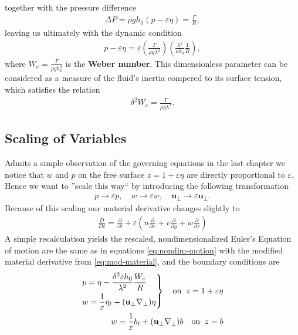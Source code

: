together with the pressure difference
\begin{align}
    \Delta P = \rho g h_0(p - \varepsilon \eta) = \frac{\Gamma}{R},
\end{align}
leaving us ultimately with the dynamic condition
\begin{align}
    p-\varepsilon\eta= \varepsilon\left( \frac{\Gamma}{\rho g\lambda^2}
    \right) \left(\frac{\lambda^2}{\varepsilon h_0}\frac{1}{R}\right),
\end{align}
where $W_e = \frac{\Gamma}{\rho g h_0^2}$ is the \textbf{Weber number}. This
dimensionless parameter can be considered as a measure of the fluid's inertia
compered to its surface tension, which satisfies the relation
\begin{align}
    \delta^2 W_e = \frac{\Gamma}{\rho g \lambda^2}.
\end{align}
\subsection{Scaling of Variables}
Admits a simple observation of the governing equations in the last chapter we
notice that $w$ and $p$ on the free surface $z = 1 + \varepsilon\eta$ are
directly proportional to $\varepsilon$. Hence we want to ''scale this way``
by introducing the following transformation
\begin{align}
    p \rightarrow \varepsilon p, \quad w \rightarrow \varepsilon w, \quad
    \mathbf{u}_\perp \rightarrow \varepsilon \mathbf{u}_\perp.
\end{align}
Because of this scaling our material derivative changes slightly to
\begin{align}\label{eq:mod-material}
    \frac{D}{Dt} = \frac{\partial }{\partial t} + \varepsilon\left(u
    \frac{\partial }{\partial x}  + v \frac{\partial }{\partial y}  + w
    \frac{\partial }{\partial z} \right)
\end{align}
A simple recalculation yields the rescaled, nondimensionalized Euler's
Equation of motion are the same as in equations \ref{eq:nondim-motion} with
the modified material derivative from \ref{eq:mod-material}, and the boundary
conditions are
\begin{align}
    \begin{drcases}
    p = \eta - \frac{\delta^2\varepsilon h_0}{\lambda^2} \frac{W_e}{R}\\
    w = \frac{1}{\varepsilon}\eta_t + (\mathbf{u}_\perp \nabla_\perp)\eta
    \end{drcases} \quad
    \text{on}\;\; z = 1+\varepsilon\eta\\
    w =\frac{1}{\varepsilon}b_t + (\mathbf{u}_\perp \nabla_\perp)b \quad
    \text{on}\;\; z=b
\end{align}
